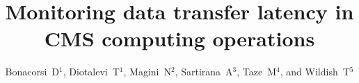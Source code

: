 \documentclass[a4paper]{jpconf}
\begin{document}
\title{Monitoring data transfer latency in CMS computing operations}

\author{Bonacorsi~D$^1$, Diotalevi~T$^1$, Magini~N$^2$, Sartirana~A$^3$, Taze~M$^4$, and Wildish~T$^5$}

\address{$^1$ University of Bologna}
\address{$^2$ Fermi National Accelerator Laboratory}
\address{$^3$ Ecole Polytechnique of Paris}
\address{$^4$ Cukurova University}
\address{$^5$ Princeton University}













\par

\end{document}
